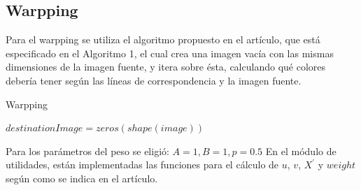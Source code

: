 \documentclass[conference]{IEEEtran}
\begin{document}
	\subsection*{Warpping}
		Para el warpping se utiliza el algoritmo propuesto en el artículo\cite{Paper}, que está especificado en el Algoritmo 1, el cual crea una imagen vacía con las mismas dimensiones de la imagen fuente, y itera sobre ésta, calculando qué colores debería tener según las líneas de correspondencia y la imagen fuente.

	\begin{algorithm}[ht]
		\caption{Warpping}	
		\DontPrintSemicolon
	$destinationImage = zeros(shape(image)) $ \;
		\label{asdf}
		\end{algorithm} 

		Para los parámetros del peso se eligió: $A = 1, B = 1, p= 0.5$
		En el módulo de utilidades, están implementadas las funciones para el cálculo de $u$, $v$, $X^\prime$ y $weight$ según como se indica en el artículo.
	
\end{document}
